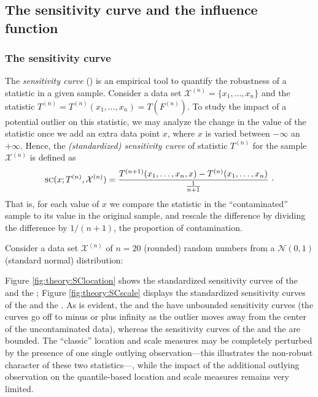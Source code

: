 \subsection{The sensitivity curve and the influence function}
\label{subsec:theory:IF}

\subsubsection{The sensitivity curve}

The \textit{sensitivity curve} () is an empirical tool to quantify the
robustness of a statistic in a given sample. Consider a data set
$\mathcal{X}^{(n)} = \{x_1, \dots, x_n\}$ and the statistic $T^{(n)} =
T^{(n)}(x_1, \dots, x_n) = T(F^{(n)})$. To study the impact of a potential
outlier on this statistic, we may analyze the change in the value of the
statistic once we add an extra data point $x$, where $x$ is varied between
$-\infty$ an $+\infty$. Hence, the \emph{(standardized) sensitivity curve} of
statistic $T^{(n)}$ for the sample $\mathcal{X}^{(n)}$ is defined as
\[
    \stsc{SC}(x; T^{(n)}, \mathcal{X}^{(n)}) = 
    \frac{T^{(n+1)}(x_1, \dots, x_n, x) - T^{(n)}(x_1, \dots, x_n)}{\frac{1}{n+1}}\ \cdot
\]
That is, for each value of $x$ we compare the statistic in the “contaminated”
sample to its value in the original sample, and rescale the difference by
dividing the difference by $1/(n+1)$, the proportion of contamination.

\begin{stexample}
Consider a data set $\mathcal{X}^{(n)}$ of $n=20$ (rounded) random numbers from a
$\mathcal{N}(0,1)$ (standard normal) distribution:


Figure \ref{fig:theory:SClocation} shows the standardized sensitivity curves
of the  and the ; Figure \ref{fig:theory:SCscale}
displays the standardized sensitivity curves of the 
and the . As is evident, the  and the
 have unbounded sensitivity curves (the curves go off
to minus or plus infinity as the outlier moves away from the center of
the uncontaminated data), whereas the sensitivity curves of the 
and the  are bounded. The “classic” location and
scale measures may be completely perturbed by the presence of one single
outlying observation---this illustrates the non-robust character of these two
statistics---, while the impact of the additional outlying observation on the
quantile-based location and scale measures remains very limited.
\end{stexample}


